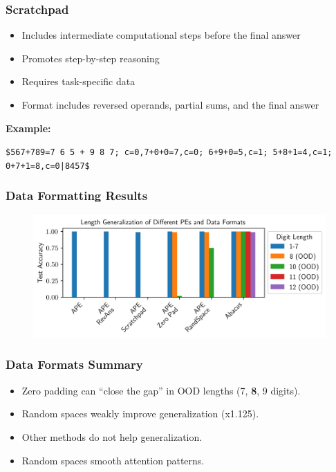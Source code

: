 \documentclass[14pt,aspectratio=169]{beamer}
\theoremstyle{remark}
\begin{document}
\begin{frame}
    \frametitle{Scratchpad}
    \begin{itemize}
        \item Includes intermediate computational steps before the final answer
        \item Promotes step-by-step reasoning
        \item Requires task-specific data
        \item Format includes reversed operands, partial sums, and the final answer
    \end{itemize}
    \vspace{0.5em}
    \textbf{Example:}
    \begin{footnotesize}
        \texttt{\$567+789=7 6 5 + 9 8 7;
            c=0,7+0+0=7,c=0;
            6+9+0=5,c=1;
            5+8+1=4,c=1;
            0+7+1=8,c=0|8457\$}
    \end{footnotesize}
\end{frame}

\begin{frame}
    \frametitle{Data Formatting Results}
    \begin{figure}
        \centering
        \includegraphics[width=0.85\linewidth]{fig/pe_results.png}
    \end{figure}
\end{frame}

\begin{frame}
    \frametitle{Data Formats Summary}
    \begin{itemize}
        \item Zero padding can ``close the gap'' in OOD lengths (7, \textbf{8}, 9 digits).
        \item Random spaces weakly improve generalization (x1.125).
        \item Other methods do not help generalization.
        \item Random spaces smooth attention patterns.
    \end{itemize}
\end{frame}
\end{document}
